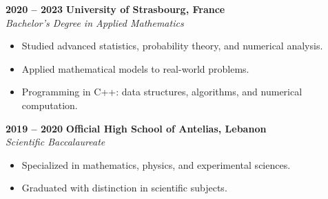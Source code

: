 \documentclass[lighthipster]{simplehipstercv}
\begin{document}
\begin{paracol}{2}
\textbf{2020 -- 2023} \hfill \textbf{University of Strasbourg, France}\\
\textit{Bachelor’s Degree in Applied Mathematics}
\begin{itemize}[leftmargin=2em, itemsep=0.2em, topsep=0em]
    \item Studied advanced statistics, probability theory, and numerical analysis.
    \item Applied mathematical models to real-world problems.
    \item Programming in C++: data structures, algorithms, and numerical computation.
\end{itemize}

\textbf{2019 -- 2020} \hfill \textbf{Official High School of Antelias, Lebanon}\\
\textit{Scientific Baccalaureate}
\begin{itemize}[leftmargin=2em, itemsep=0.2em, topsep=0em]
    \item Specialized in mathematics, physics, and experimental sciences.
    \item Graduated with distinction in scientific subjects.
\end{itemize}








\end{paracol}
\end{document}
